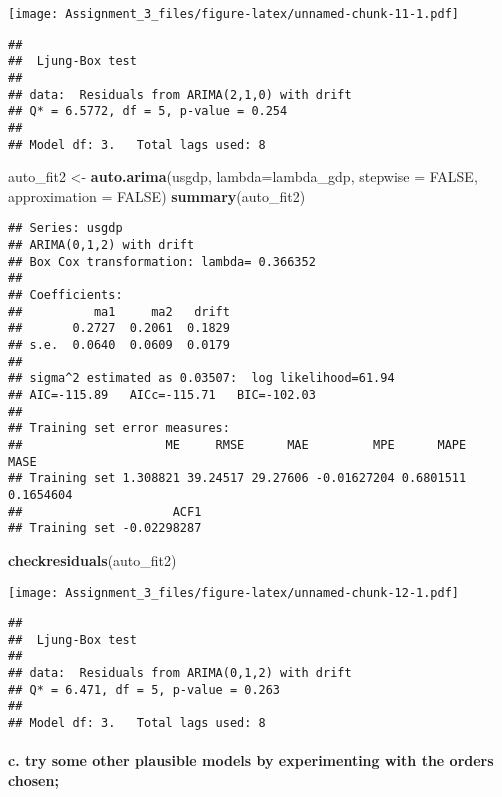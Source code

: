 \documentclass[]{article}
\newenvironment{Shaded}{\begin{snugshade}}{\end{snugshade}}
\newcommand{\KeywordTok}[1]{\textcolor[rgb]{0.13,0.29,0.53}{\textbf{#1}}}
\newcommand{\DataTypeTok}[1]{\textcolor[rgb]{0.13,0.29,0.53}{#1}}
\newcommand{\StringTok}[1]{\textcolor[rgb]{0.31,0.60,0.02}{#1}}
\newcommand{\OtherTok}[1]{\textcolor[rgb]{0.56,0.35,0.01}{#1}}
\newcommand{\NormalTok}[1]{#1}
\let\oldparagraph\paragraph
\renewcommand{\paragraph}[1]{\oldparagraph{#1}\mbox{}}
\begin{document}
\texttt{[image: Assignment\_3\_files/figure-latex/unnamed-chunk-11-1.pdf]}

\begin{verbatim}
## 
##  Ljung-Box test
## 
## data:  Residuals from ARIMA(2,1,0) with drift
## Q* = 6.5772, df = 5, p-value = 0.254
## 
## Model df: 3.   Total lags used: 8
\end{verbatim}

\begin{Shaded}
\begin{Highlighting}[]
\NormalTok{auto_fit2 <-}\StringTok{ }\KeywordTok{auto.arima}\NormalTok{(usgdp, }\DataTypeTok{lambda=}\NormalTok{lambda_gdp, }\DataTypeTok{stepwise =} \OtherTok{FALSE}\NormalTok{, }\DataTypeTok{approximation =} \OtherTok{FALSE}\NormalTok{)}
\KeywordTok{summary}\NormalTok{(auto_fit2)}
\end{Highlighting}
\end{Shaded}

\begin{verbatim}
## Series: usgdp 
## ARIMA(0,1,2) with drift 
## Box Cox transformation: lambda= 0.366352 
## 
## Coefficients:
##          ma1     ma2   drift
##       0.2727  0.2061  0.1829
## s.e.  0.0640  0.0609  0.0179
## 
## sigma^2 estimated as 0.03507:  log likelihood=61.94
## AIC=-115.89   AICc=-115.71   BIC=-102.03
## 
## Training set error measures:
##                    ME     RMSE      MAE         MPE      MAPE      MASE
## Training set 1.308821 39.24517 29.27606 -0.01627204 0.6801511 0.1654604
##                     ACF1
## Training set -0.02298287
\end{verbatim}

\begin{Shaded}
\begin{Highlighting}[]
\KeywordTok{checkresiduals}\NormalTok{(auto_fit2)}
\end{Highlighting}
\end{Shaded}

\texttt{[image: Assignment\_3\_files/figure-latex/unnamed-chunk-12-1.pdf]}

\begin{verbatim}
## 
##  Ljung-Box test
## 
## data:  Residuals from ARIMA(0,1,2) with drift
## Q* = 6.471, df = 5, p-value = 0.263
## 
## Model df: 3.   Total lags used: 8
\end{verbatim}

\paragraph{c. try some other plausible models by experimenting with the
orders
chosen;}\label{c.-try-some-other-plausible-models-by-experimenting-with-the-orders-chosen}
\end{document}
